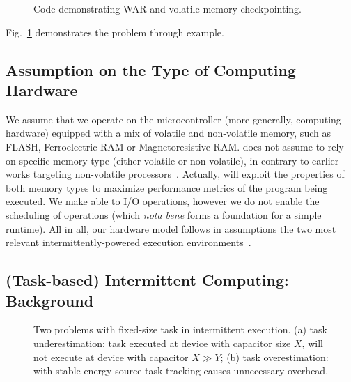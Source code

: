 \begin{figure}
	\centering
	\caption{Code demonstrating WAR and volatile memory checkpointing.}
	\label{fig:code_demo_incosistency}
\end{figure}

Fig.~\ref{fig:code_demo_incosistency} demonstrates the problem through example. 

\subsection{Assumption on the Type of Computing Hardware}
\label{sec:background_hardware}

We assume that we operate on the microcontroller (more generally, computing hardware) equipped with a mix of volatile and non-volatile memory, such as FLASH, Ferroelectric RAM or Magnetoresistive RAM. \sys does not assume to rely on specific memory type (either volatile or non-volatile), in contrary to earlier works targeting non-volatile processors~\cite{su_date_2017,ratchet,quickrecall,nvp}. Actually, \sys will exploit the properties of both memory types to maximize performance metrics of the program being executed. We make \sys able to I/O operations, however we do not enable the scheduling of operations (which \emph{nota bene} forms a foundation for a simple runtime). All in all, our hardware model follows in assumptions the two most relevant intermittently-powered execution environments~\cite{alpaca,chain}.

\subsection{(Task-based) Intermittent Computing: Background}

\begin{figure}
	\centering
	\caption{Two problems with fixed-size task in intermittent execution. (a) task underestimation: task executed at device with capacitor size $X$, will not execute at device with capacitor $X\gg Y$; (b) task overestimation: with stable energy source task tracking causes unnecessary overhead.}
	\label{fig:fixed_task_problem}
\end{figure}

